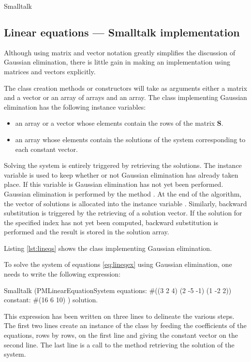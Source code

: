 \begin{displaycode}{Smalltalk}
\subsection{Linear equations --- Smalltalk implementation}
Although using matrix and vector notation greatly simplifies the discussion of Gaussian
elimination, there is little gain in making an implementation
using matrices and vectors explicitly.

The class creation methods or constructors will take as arguments
either a matrix and a vector or an array of arrays and an array.
The class implementing Gaussian elimination has the following
instance variables:
\begin{itemize}
  \item {} an array or a vector whose elements contain the rows of the
  matrix $\textbf{S}$.
  \item {} an array whose elements contain the solutions of the
  system corresponding to each constant vector.
\end{itemize}

Solving the system is entirely triggered by retrieving the
solutions.
The instance variable  is used to keep
whether or not Gaussian elimination has already taken place. If
this variable is  Gaussian elimination has not yet been
performed. Gaussian elimination is performed by the method .
At the end of the algorithm, the vector of solutions is
allocated into the instance variable . Similarly,
backward substitution is triggered by the retrieving of a solution
vector. If the solution for the specified index has not yet been
computed, backward substitution is performed and the result is
stored in the solution array.

Listing \ref{lst:lineqs} shows the class  implementing Gaussian elimination.

To solve the system of equations \ref{eq:lineqex} using Gaussian elimination, one needs to write the following expression:
\begin{displaycode}{Smalltalk}
(PMLinearEquationSystem equations: #((3 2 4)
                                   (2 -5 -1)
                                   (1 -2 2))
                      constant: #(16 6 10)
     ) solution.
\end{displaycode}
This expression has been written on three lines to delineate the
various steps. The first two lines create an instance of the class
 by feeding the coefficients of the
equations, rows by rows, on the first line and giving the constant
vector on the second line. The last line is a call to the method
 retrieving the solution of the system.


\end{displaycode}
